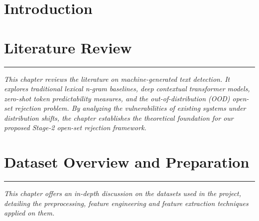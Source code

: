 \documentclass[12pt,phd,times]{pkmthesis}
\begin{document}
\chapter{Introduction}
\vspace{-1cm}

\label{chap:intro}


\chapter{Literature Review}
\vspace{-1cm}
\noindent \rule{6.6in}{0.01in}
\emph{This chapter reviews the literature on machine-generated text detection. It explores traditional lexical n-gram baselines, deep contextual transformer models, zero-shot token predictability measures, and the out-of-distribution (OOD) open-set rejection problem. By analyzing the vulnerabilities of existing systems under distribution shifts, the chapter establishes the theoretical foundation for our proposed Stage-2 open-set rejection framework.}
\label{chap:L_survey}


\chapter{Dataset Overview and Preparation}
\vspace{-1cm}
\noindent \rule{6.6in}{0.01in}
\emph{This chapter offers an in-depth discussion on the datasets used in the project, detailing the preprocessing, feature engineering and feature extraction techniques applied on them.}
\label{chap:problem_statement}
\end{document}
